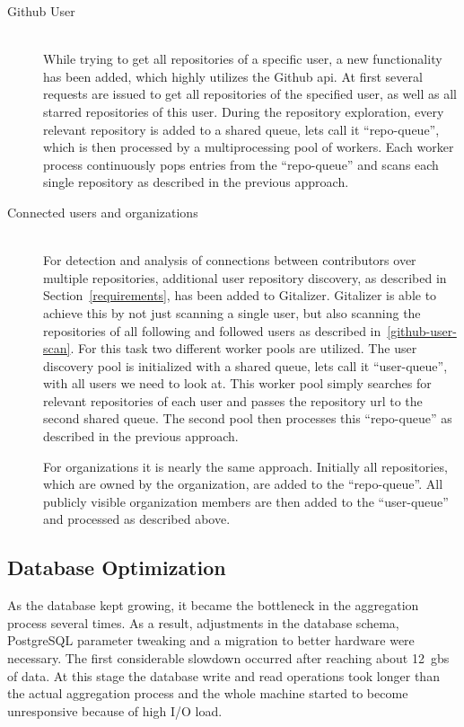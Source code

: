 \begin{description}
    \item[Github User]\label{github-repo-scan} \hfill \\
        While trying to get all repositories of a specific user, a new functionality has been added, which highly utilizes the Github \ac{api}.
        At first several requests are issued to get all repositories of the specified user, as well as all starred repositories of this user.
        During the repository exploration, every relevant repository is added to a shared queue, lets call it ``repo-queue'', which is then processed by a multiprocessing pool of workers.
        Each worker process continuously pops entries from the ``repo-queue'' and scans each single repository as described in the previous approach.


    \item[Connected users and organizations]\label{github-repo-scan} \hfill \\
        For detection and analysis of connections between contributors over multiple repositories, additional user repository discovery, as described in Section~\ref{requirements}, has been added to Gitalizer.
        Gitalizer is able to achieve this by not just scanning a single user, but also scanning the repositories of all following and followed users as described in~\ref{github-user-scan}.
        For this task two different worker pools are utilized.
        The user discovery pool is initialized with a shared queue, lets call it ``user-queue'', with all users we need to look at.
        This worker pool simply searches for relevant repositories of each user and passes the repository \ac{url} to the second shared queue.
        The second pool then processes this ``repo-queue'' as described in the previous approach.

        For organizations it is nearly the same approach.
        Initially all repositories, which are owned by the organization, are added to the ``repo-queue''.
        All publicly visible organization members are then added to the ``user-queue'' and processed as described above.
\end{description}


\subsection{Database Optimization}
As the database kept growing, it became the bottleneck in the aggregation process several times.
As a result, adjustments in the database schema, PostgreSQL parameter tweaking and a migration to better hardware were necessary.
The first considerable slowdown occurred after reaching about 12~\acp{gb} of data.
At this stage the database write and read operations took longer than the actual aggregation process and the whole machine started to become unresponsive because of high I/O load.

